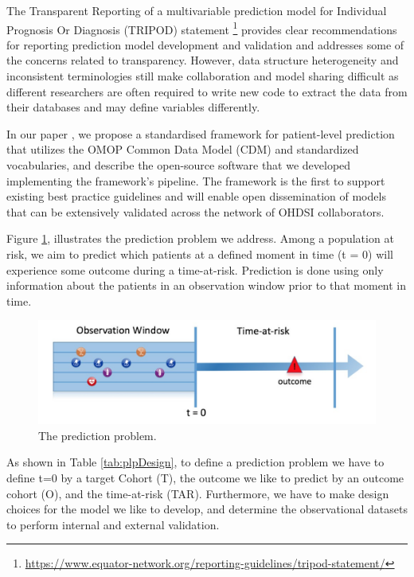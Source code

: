\documentclass[]{book}
\let\rmarkdownfootnote\footnote%
\def\footnote{\protect\rmarkdownfootnote}
\begin{document}
The Transparent Reporting of a multivariable prediction model for
Individual Prognosis Or Diagnosis (TRIPOD) statement \footnote{\url{https://www.equator-network.org/reporting-guidelines/tripod-statement/}}
provides clear recommendations for reporting prediction model
development and validation and addresses some of the concerns related to
transparency. However, data structure heterogeneity and inconsistent
terminologies still make collaboration and model sharing difficult as
different researchers are often required to write new code to extract
the data from their databases and may define variables differently.

In our paper \citep{reps2018}, we propose a standardised framework for
patient-level prediction that utilizes the OMOP Common Data Model (CDM)
and standardized vocabularies, and describe the open-source software
that we developed implementing the framework's pipeline. The framework
is the first to support existing best practice guidelines and will
enable open dissemination of models that can be extensively validated
across the network of OHDSI collaborators.

Figure \ref{fig:figure1}, illustrates the prediction problem we address.
Among a population at risk, we aim to predict which patients at a
defined moment in time (t = 0) will experience some outcome during a
time-at-risk. Prediction is done using only information about the
patients in an observation window prior to that moment in time.

\begin{figure}
\includegraphics[width=1\linewidth]{images/PatientLevelPrediction/Figure1} \caption{The prediction problem.}\label{fig:figure1}
\end{figure}

As shown in Table \ref{tab:plpDesign}, to define a prediction problem we
have to define t=0 by a target Cohort (T), the outcome we like to
predict by an outcome cohort (O), and the time-at-risk (TAR).
Furthermore, we have to make design choices for the model we like to
develop, and determine the observational datasets to perform internal
and external validation.
\end{document}
